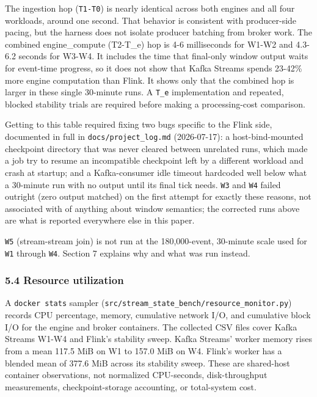 \documentclass[
]{article}
\begin{document}
The ingestion hop (\texttt{T1-T0}) is nearly identical across both
engines and all four workloads, around one second. That behavior is
consistent with producer-side pacing, but the harness does not isolate
producer batching from broker work. The combined engine_compute (T2-T_e) hop is
4-6 milliseconds for W1-W2 and 4.3-6.2 seconds for W3-W4. It includes
the time that final-only window output waits for event-time progress, so
it does not show that Kafka Streams spends 23-42\% more engine
computation than Flink. It shows only that the combined hop is larger in
these single 30-minute runs. A \texttt{T\_e} implementation and
repeated, blocked stability trials are required before making a
processing-cost comparison.

Getting to this table required fixing two bugs specific to the Flink
side, documented in full in \texttt{docs/project\_log.md} (2026-07-17):
a host-bind-mounted checkpoint directory that was never cleared between
unrelated runs, which made a job try to resume an incompatible
checkpoint left by a different workload and crash at startup; and a
Kafka-consumer idle timeout hardcoded well below what a 30-minute run
with no output until its final tick needs. \texttt{W3} and \texttt{W4}
failed outright (zero output matched) on the first attempt for exactly
these reasons, not associated with of anything about window semantics; the
corrected runs above are what is reported everywhere else in this paper.

\texttt{W5} (stream-stream join) is not run at the 180,000-event,
30-minute scale used for \texttt{W1} through \texttt{W4}. Section 7
explains why and what was run instead.

\hypertarget{resource-utilization}{%
\subsubsection{5.4 Resource utilization}\label{resource-utilization}}

A \texttt{docker\ stats} sampler
(\texttt{src/stream\_state\_bench/resource\_monitor.py}) records CPU
percentage, memory, cumulative network I/O, and cumulative block I/O for
the engine and broker containers. The collected CSV files cover Kafka
Streams W1-W4 and Flink's stability sweep. Kafka Streams' worker memory
rises from a mean 117.5 MiB on W1 to 157.0 MiB on W4. Flink's worker has
a blended mean of 377.6 MiB across its stability sweep. These are
shared-host container observations, not normalized CPU-seconds,
disk-throughput measurements, checkpoint-storage accounting, or
total-system cost.
\end{document}
